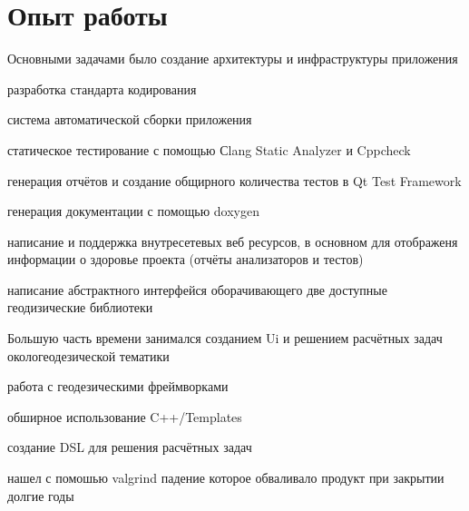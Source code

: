 \documentclass[a4paper]{curricula-vitae}
\begin{document}
\begin{minipage}[t]{0.66\textwidth} %

\section{Опыт работы} 

Основными задачами было создание архитектуры и инфраструктуры приложения
\vspace{\topsep} %
\begin{tightitemize}
\item разработка стандарта кодирования
\item система автоматической сборки приложения
\item статическое тестирование с помощью Сlang Static Analyzer и Cppcheck
\item генерация отчётов и создание общирного количества тестов в Qt Test Framework
\item генерация документации с помощью doxygen
\item написание и поддержка внутресетевых веб ресурсов, в основном для отображеня
информации о здоровье проекта (отчёты анализаторов и тестов)
\item написание абстрактного интерфейся оборачивающего две доступные геодизические библиотеки
\end{tightitemize}

\insertspace

Большую часть времени занимался созданием Ui и
решением расчётных задач окологеодезической тематики
\begin{tightitemize}
\item работа с геодезическими фреймворками
\item обширное использование C++/Templates
\item создание DSL для решения расчётных задач
\item нашел с помошью valgrind падение которое обваливало продукт при закрытии долгие годы
\end{tightitemize}

\insertspace


\end{minipage}
\end{document}
